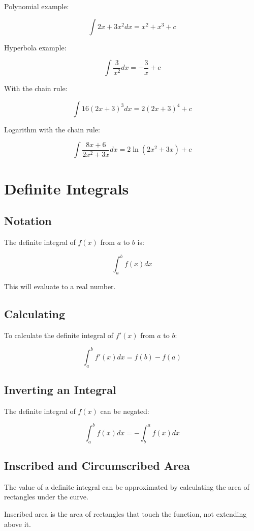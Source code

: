 \documentclass[a4paper,11pt]{article}
\begin{document}
Polynomial example:

$$
\int 2x + 3x^2 dx = x^2 + x^3 + c
$$

Hyperbola example:

$$
\int \frac{3}{x^2} dx = -\frac{3}{x} + c
$$

With the chain rule:

$$
\int 16(2x + 3)^3 dx = 2(2x + 3)^4 + c
$$

Logarithm with the chain rule:

$$
\int \frac{8x + 6}{2x^2 + 3x} dx = 2 \ln(2x^2 + 3x) + c
$$




\section{Definite Integrals}

\subsection{Notation}

The definite integral of $f(x)$ from $a$ to $b$ is:

$$
\int_a^b f(x) dx
$$

This will evaluate to a real number.


\subsection{Calculating}

To calculate the definite integral of $f'(x)$ from $a$ to $b$:

$$
\int_a^b f'(x) dx = f(b) - f(a)
$$


\subsection{Inverting an Integral}

The definite integral of $f(x)$ can be negated:

$$
\int_a^b f(x) dx = -\int_b^a f(x) dx
$$


\subsection{Inscribed and Circumscribed Area}

The value of a definite integral can be approximated by calculating the area of
rectangles under the curve.

Inscribed area is the area of rectangles that touch the function, not extending
above it.
\end{document}
